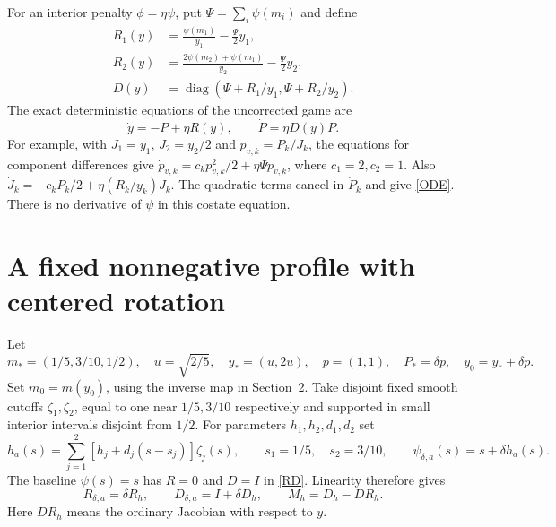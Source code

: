 \documentclass[11pt,a4paper]{article}
\begin{document}
For an interior penalty $\phi=\eta\psi$, put
$\Psi=\sum_i\psi(m_i)$ and define
\begin{equation}\label{RD}
 \begin{split}
 R_1(y)&=\frac{\psi(m_1)}{y_1}-\frac\Psi2y_1,\\
 R_2(y)&=\frac{2\psi(m_2)+\psi(m_1)}{y_2}-\frac\Psi2y_2,\\
 D(y)&=\operatorname{diag}(\Psi+R_1/y_1,\Psi+R_2/y_2).
 \end{split}
\end{equation}
The exact deterministic equations of the uncorrected game are
\begin{equation}\label{ODE}
 \dot y=-P+\eta R(y),\qquad \dot P=\eta D(y)P.
\end{equation}
For example, with $J_1=y_1$, $J_2=y_2/2$ and
$p_{v,k}=P_k/J_k$, the equations for component differences give
$\dot p_{v,k}=c_kp_{v,k}^2/2+\eta\Psi p_{v,k}$,
where $c_1=2,c_2=1$. Also
$\dot J_k=-c_kP_k/2+\eta(R_k/y_k)J_k$.
The quadratic terms cancel in $\dot P_k$ and give \eqref{ODE}.
There is no derivative of $\psi$ in this costate equation.

\section{A fixed nonnegative profile with centered rotation}
Let
\[
 m_*=(1/5,3/10,1/2),\quad u=\sqrt{2/5},\quad y_*=(u,2u),
 \quad p=(1,1),\quad P_*=\delta p,\quad y_0=y_*+\delta p.
\]
Set $m_0=m(y_0)$, using the inverse map in Section~2.
Take disjoint fixed smooth cutoffs $\zeta_1,\zeta_2$, equal to one
near $1/5,3/10$ respectively and supported in small interior intervals
disjoint from $1/2$. For parameters $h_1,h_2,d_1,d_2$ set
\[
 h_a(s)=\sum_{j=1}^2[h_j+d_j(s-s_j)]\zeta_j(s),
 \qquad s_1=1/5,\quad s_2=3/10,\qquad
 \psi_{\delta,a}(s)=s+\delta h_a(s).
\]
The baseline $\psi(s)=s$ has $R=0$ and $D=I$ in \eqref{RD}.
Linearity therefore gives
\begin{equation}\label{baseline}
 R_{\delta,a}=\delta R_h,\qquad D_{\delta,a}=I+\delta D_h,
 \qquad M_h=D_h-DR_h.
\end{equation}
Here $DR_h$ means the ordinary Jacobian with respect to $y$.
\end{document}
